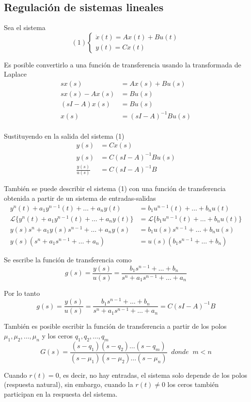 \subsection{Regulación de sistemas lineales}
Sea el sistema
\[
    (1)
    \left\{
        \begin{array}{lll}
            \dot{x}(t) = Ax(t) + Bu(t)\\
            y(t) = Cx(t)
        \end{array}
    \right.
\]

Es posible convertirlo a una función de transferencia usando la transformada de Laplace
\[
    \begin{split}
        sx(s) & = Ax(s) + Bu(s)\\
        sx(s) - Ax(s) & = Bu(s)\\
        (sI-A)x(s) & = Bu(s)\\
        x(s) & = (sI-A)^{-1}Bu(s)\\
    \end{split}
\]

Sustituyendo en la salida del sistema (1)
\[
    \begin{split}
        y(s) & = Cx(s) \\
        y(s) & = C(sI-A)^{-1}Bu(s) \\
        \frac{y(s)}{u(s)} & = C(sI-A)^{-1}B
    \end{split}
\]

También se puede describir el sistema (1) con una función de transferencia obtenida a partir de un sistema de entradas-salidas 
\[
    \begin{split}
        y^{n}(t) + a_{1}y^{n-1}(t) + \ldots + a_{n}y(t) & = b_{1}u^{n-1}(t) + \ldots + b_{n}u(t) \\
        \mathcal{L} \{ y^{n}(t) + a_{1}y^{n-1}(t) + \ldots + a_{n}y(t) \} & = \mathcal{L} \{ b_{1}u^{n-1}(t) + \ldots + b_{n}u(t) \}\\
        y(s)s^{n} + a_{1}y(s)s^{n-1} + \ldots + a_{n}y(s) & = b_{1}u(s)s^{n-1} + \ldots + b_{n}u(s)\\
        y(s) (s^{n} + a_{1}s^{n-1} +\ldots + a_{n} ) & = u(s) (b_{1}s^{n-1} + \ldots + b_{n})
    \end{split}
\]

Se escribe la función de transferencia como 
\[
    g(s) = \frac{y(s)}{u(s)} = \frac{ b_{1}s^{n-1} + \ldots + b_{n} }{ s^{n} + a_{1}s^{n-1} +\ldots + a_{n} }
\]

Por lo tanto
\[
    g(s) = \frac{y(s)}{u(s)} = \frac{ b_{1}s^{n-1} + \ldots + b_{n} }{ s^{n} + a_{1}s^{n-1} +\ldots + a_{n} } = C(sI-A)^{-1}B
\]

También es posible escribir la función de transferencia a partir de los polos \( \mu_{1}, \mu_{2}, \ldots, \mu_{n} \) y los ceros \( q_{1}, q_{2}, \ldots, q_{m} \)
\[
    G(s) = \frac{(s-q_{1}) (s-q_{2}) \ldots (s-q_{m})}{(s-\mu_{1}) (s-\mu_{2}) \ldots (s-\mu_{n})} \;\; donde \;\; m < n
\]

Cuando \( r(t) = 0 \), es decir, no hay entradas, el sistema solo depende de los polos (respuesta natural), sin embargo, cuando la \( r(t) \not = 0 \) los ceros también participan en la respuesta del sistema.